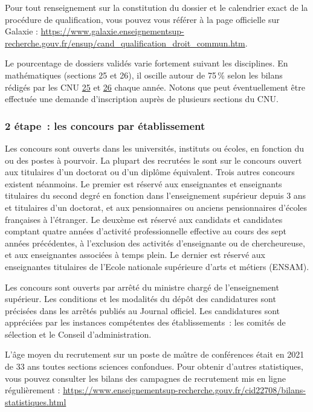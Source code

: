 Pour tout renseignement sur la constitution du dossier et le calendrier exact de la proc\'edure de qualification, 
vous pouvez vous r\'ef\'erer \`a la page officielle sur Galaxie : \url{https://www.galaxie.enseignementsup-recherche.gouv.fr/ensup/cand_qualification_droit_commun.htm}.

Le pourcentage de dossiers valid\'es
varie fortement suivant les disciplines. En math\'ematiques
(sections 25 et 26), il oscille autour de 75\,\% selon les bilans r\'edig\'es par les CNU 
\href{http://cnu25.emath.fr/}{25} et \href{http://cnu26.emath.fr/}{26} chaque ann\'ee. Notons que peut
\'eventuellement \^etre effectu\'ee
une demande d'inscription aupr\`es de plusieurs sections du CNU.

\subsubsection*{2\ieme{} \'etape~: les concours par \'etablissement}

Les concours sont ouverts dans les universit\'es, instituts ou
\'ecoles, en fonction du ou des postes \`a pourvoir. La plupart des
recrut\'e\mp e\mp s le sont sur le concours ouvert aux titulaires d'un
doctorat ou d'un dipl\^ome \'equivalent. Trois autres concours
existent n\'eanmoins. Le premier est r\'eserv\'e aux enseignantes et enseignants
titulaires du second degr\'e en fonction dans l'enseignement
sup\'erieur depuis 3 ans et titulaires d'un doctorat, et aux
pensionnaires ou anciens pensionnaires d'\'ecoles fran\c{c}aises \`a
l'\'etranger. Le deux\`eme est r\'eserv\'e aux candidats et candidates comptant
quatre ann\'ees d'activit\'e professionnelle effective au cours des
sept ann\'ees pr\'ec\'edentes, \`a l'exclusion des activit\'es
d'enseignant\mp e ou de chercheur\mp euse, et aux enseignant\mp e\mp s associ\'e\mp e\mp s \`a
temps plein.
Le dernier est r\'eserv\'e aux enseignant\mp e\mp s titulaires de l'Ecole nationale sup\'erieure d'arts et m\'etiers (ENSAM).

Les concours sont ouverts par arr\^et\'e du ministre charg\'e de
l'enseignement sup\'erieur. Les conditions et les modalit\'es du
d\'ep\^ot des candidatures sont pr\'ecis\'ees dans les arr\^et\'es
publi\'es au Journal officiel. Les candidatures sont
appr\'eci\'ees par les instances comp\'etentes des
\'etablissements~:
les comit\'es de s\'election et le Conseil d'administration.

L'\^age moyen du recrutement sur un poste de ma\^\i  tre de
conf\'erences \'etait en 2021 de 33 ans toutes sections sciences confondues. Pour obtenir d'autres statistiques, vous pouvez consulter les bilans des campagnes de recrutement mis en ligne r\'e\-gu\-li\`erement :
{\url{https://www.enseignementsup-recherche.gouv.fr/cid22708/bilans-statistiques.html}}


